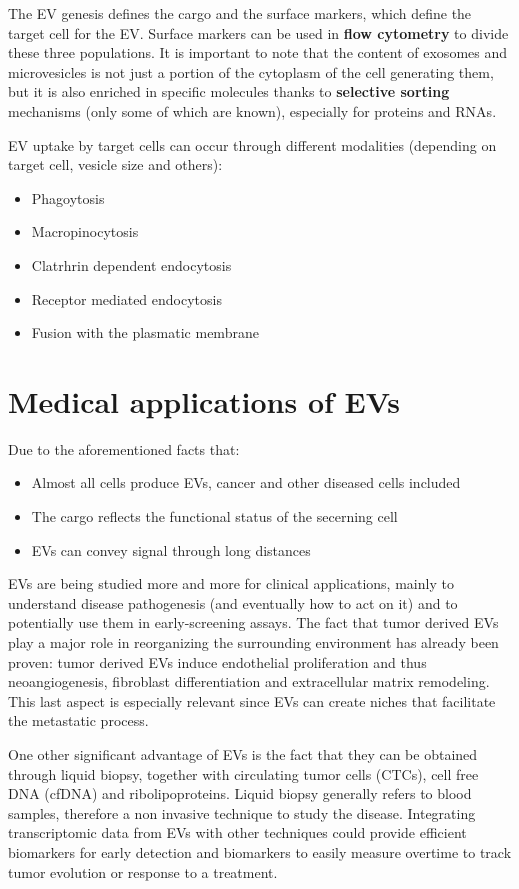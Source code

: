   The EV genesis defines the cargo and the surface markers, which define the target cell for the EV. Surface markers can be used in \textbf{flow cytometry} to divide these three populations. It is important to note that the content of exosomes and microvesicles is not just a portion of the cytoplasm of the cell generating them, but it is also enriched in specific molecules thanks to \textbf{selective sorting} mechanisms (only some of which are known), especially for proteins and RNAs.

  EV uptake by target cells can occur through different modalities (depending on target cell, vesicle size and others):
  \begin{itemize}
    \item Phagoytosis 
    \item Macropinocytosis 
    \item Clatrhrin dependent endocytosis
    \item Receptor mediated endocytosis 
    \item Fusion with the plasmatic membrane
  \end{itemize}


\section{Medical applications of EVs}

  Due to the aforementioned facts that:
  \begin{itemize}
    \item Almost all cells produce EVs, cancer and other diseased cells included
    \item The cargo reflects the functional status of the secerning cell
    \item EVs can convey signal through long distances
  \end{itemize}
  EVs are being studied more and more for clinical applications, mainly to understand disease pathogenesis (and eventually how to act on it) and to potentially use them in early-screening assays. 
  The fact that tumor derived EVs play a major role in reorganizing the surrounding environment has already been proven: tumor derived EVs induce endothelial proliferation and thus neoangiogenesis, fibroblast differentiation and extracellular matrix remodeling. This last aspect is especially relevant since EVs can create niches that facilitate the metastatic process. 

  One other significant advantage of EVs is the fact that they can be obtained through liquid biopsy, together with circulating tumor cells (CTCs), cell free DNA (cfDNA) and ribolipoproteins. Liquid biopsy generally refers to blood samples, therefore a non invasive technique to study the disease.
  Integrating transcriptomic data from EVs with other techniques could provide efficient biomarkers for early detection and biomarkers to easily measure overtime to track tumor evolution or response to a treatment. 

